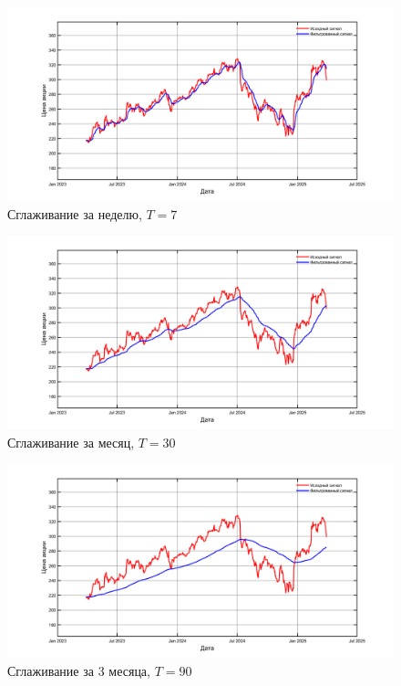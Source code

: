 \documentclass[a4paper]{article}
\begin{document}
\begin{figure}[H]
    \centering
    \includegraphics[width=\linewidth]{ex2/7.png}
    \caption{Сглаживание за неделю, $T = 7$}
\end{figure}

\begin{figure}[H]
    \centering
    \includegraphics[width=\linewidth]{ex2/30.png}
    \caption{Сглаживание за месяц, $T = 30$}
\end{figure}

\begin{figure}[H]
    \centering
    \includegraphics[width=\linewidth]{ex2/90.png}
    \caption{Сглаживание за 3 месяца, $T = 90$}
\end{figure}
\end{document}
